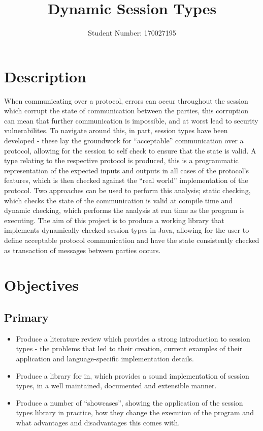 \documentclass{article}
\author{Student Number: 170027195}
\title{Dynamic Session Types}
\begin{document}
\maketitle
\section{Description}
When communicating over a protocol, errors can occur throughout the session which corrupt the state of communication between the parties, this corruption can mean that further communication is impossible, and at worst lead to security vulnerabilites. To navigate around this, in part, session types have been developed - these lay the groundwork for “acceptable” communication over a protocol, allowing for the session to self check to ensure that the state is valid. A type relating to the respective protocol is produced, this is a programmatic representation of the expected inputs and outputs in all cases of the protocol’s features, which is then checked against the “real world” implementation of the protocol. Two approaches can be used to perform this analysis; static checking, which checks the state of the communication is valid at compile time and dynamic checking, which performs the analysis at run time as the program is executing. The aim of this project is to produce a working library that implements dynamically checked session types in Java, allowing for the user to define acceptable protocol communication and have the state consistently checked as transaction of messages between parties occurs.
\section{Objectives}
\subsection{Primary}
\begin{itemize}
	\item Produce a literature review which provides a strong introduction to session types - the problems that led to their creation, current examples of their application and language-specific implementation details.
	\item Produce a library for in, which provides a sound implementation of session types, in a well maintained, documented and extensible manner.
	\item Produce a number of “showcases”, showing the application of the session types library in practice, how they change the execution of the program and what advantages and disadvantages this comes with.
\end{itemize}
\end{document}
